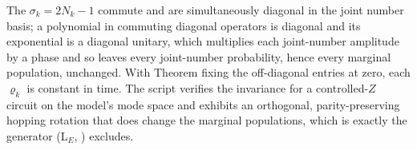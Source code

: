 The $\sigma_k = 2N_k - 1$ commute and are simultaneously diagonal in the joint number basis; a polynomial in commuting diagonal operators is diagonal and its exponential is a diagonal unitary, which multiplies each joint-number amplitude by a phase and so leaves every joint-number probability, hence every marginal population, unchanged. With Theorem  fixing the off-diagonal entries at zero, each $\varrho_k$ is constant in time. The script verifies the invariance for a controlled-$Z$ circuit on the model's mode space and exhibits an orthogonal, parity-preserving hopping rotation that does change the marginal populations, which is exactly the generator (L$_E$, ) excludes.
